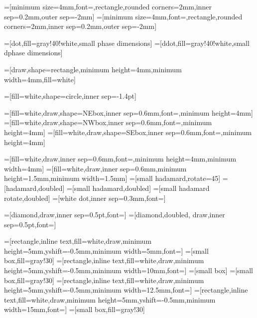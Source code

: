 =[minimum size=4mm,font=\tiny,rectangle,rounded corners=2mm,inner sep=0.2mm,outer sep=-2mm]
=[minimum size=4mm,font=\tiny,rectangle,rounded corners=2mm,inner sep=0.2mm,outer sep=-2mm]

=[dot,fill=gray!40!white,small phase dimensions]
=[ddot,fill=gray!40!white,small dphase dimensions]


=[draw,shape=rectangle,minimum height=4mm,minimum width=4mm,fill=white]

=[fill=white,shape=circle,inner sep=-1.4pt]

=[fill=white,draw,shape=NEbox,inner sep=0.6mm,font=\footnotesize,minimum height=4mm]
=[fill=white,draw,shape=NWbox,inner sep=0.6mm,font=\footnotesize,minimum height=4mm]
=[fill=white,draw,shape=SEbox,inner sep=0.6mm,font=\footnotesize,minimum height=4mm]


=[fill=white,draw,inner sep=0.6mm,font=\footnotesize,minimum height=4mm,minimum width=4mm]
=[fill=white,draw,inner sep=0.6mm,minimum height=1.5mm,minimum width=1.5mm]
=[small hadamard,rotate=45]
=[hadamard,doubled]
=[small hadamard,doubled]
=[small hadamard rotate,doubled]
=[white dot,inner sep=0.3mm,font=\footnotesize]

=[diamond,draw,inner sep=0.5pt,font=\small]
=[diamond,doubled, draw,inner sep=0.5pt,font=\small]

=[rectangle,inline text,fill=white,draw,minimum height=5mm,yshift=-0.5mm,minimum width=5mm,font=\small]
=[small box,fill=gray!30]
=[rectangle,inline text,fill=white,draw,minimum height=5mm,yshift=-0.5mm,minimum width=10mm,font=\small]
=[small box] %
=[small box,fill=gray!30]
=[rectangle,inline text,fill=white,draw,minimum height=5mm,yshift=-0.5mm,minimum width=12.5mm,font=\small]
=[rectangle,inline text,fill=white,draw,minimum height=5mm,yshift=-0.5mm,minimum width=15mm,font=\small]
=[small box,fill=gray!30]

